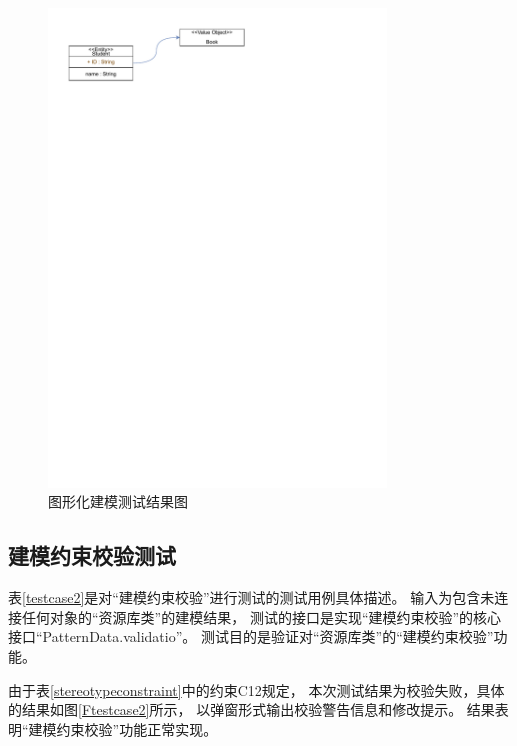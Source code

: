     \begin{figure}[!htbp] %
        \centering %
        \includegraphics[width=0.8\textwidth]{FIGs/chapter5/Ftestcase1.pdf} %
        \caption{图形化建模测试结果图} %
        \label{Ftestcase1} %
    \end{figure}%

\subsection{建模约束校验测试}

表\ref{testcase2}是对“建模约束校验”进行测试的测试用例具体描述。
输入为包含未连接任何对象的“资源库类”的建模结果，
测试的接口是实现“建模约束校验”的核心接口“PatternData.validatio”。
测试目的是验证对“资源库类”的“建模约束校验”功能。

由于表\ref{stereotypeconstraint}中的约束C12规定，
本次测试结果为校验失败，具体的结果如图\ref{Ftestcase2}所示，
以弹窗形式输出校验警告信息和修改提示。
结果表明“建模约束校验”功能正常实现。

